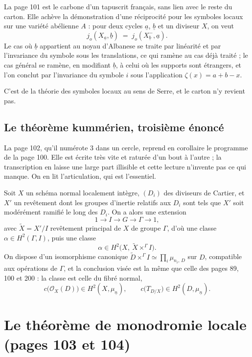 \documentclass[11pt,a4paper]{article}
\begin{document}
La page 101 est le carbone d'un tapuscrit français, sans lien avec le reste du
carton. Elle achève la démonstration d'une réciprocité pour les symboles locaux
sur une variété abélienne $A$ : pour deux cycles $\underline{a}$,
$\underline{b}$ et un diviseur $X$, on veut
\[
  j_{o}(X_{\underline{a}}, \underline{b}) \;=\;
  j_{o}(X^{-}_{\underline{b}}, \underline{a}) .
\]
Le cas où $\underline{b}$ appartient au noyau d'Albanese se traite par
linéarité et par l'invariance du symbole sous les translations, ce qui ramène
au cas déjà traité ; le cas général se ramène, en modifiant $\underline{b}$, à
celui où les supports sont étrangers, et l'on conclut par l'invariance du
symbole $i$ sous l'application $\zeta(x) = a + b - x$.

C'est de la théorie des symboles locaux au sens de Serre, et le carton n'y
revient pas.

\subsection*{Le théorème kummérien, troisième énoncé}

La page 102, qu'il numérote 3 dans un cercle, reprend en corollaire le
programme de la page 100. Elle est écrite très vite et raturée d'un bout à
l'autre ; la transcription en laisse une large part illisible et cette lecture
n'invente pas ce qui manque. On en lit l'articulation, qui est l'essentiel.

Soit $X$ un schéma normal localement intègre, $(D_{i})$ des diviseurs de
Cartier, et $X'$ un revêtement dont les groupes d'inertie relatifs aux $D_{i}$
sont tels que $X'$ soit modérément ramifié le long des $D_{i}$. On a alors une
extension
\[
  1 \longrightarrow I \longrightarrow G \longrightarrow \Gamma
  \longrightarrow 1 ,
\]
avec $\tilde{X} = X'/I$ revêtement principal de $X$ de groupe $\Gamma$, d'où
une classe $\alpha \in H^{2}(\Gamma, I)$, puis une classe
\[
  \alpha \in H^{2}\bigl(X,\ \tilde{X} \times^{\Gamma} I\bigr) .
\]
On dispose d'un isomorphisme canonique
$\tilde{D} \times^{\Gamma} I \simeq \prod_{i} \mu_{n_{i},\,D}$ sur $D$,
compatible aux opérations de $\Gamma$, et la conclusion visée est la même que
celle des pages 89, 100 et 200 : la classe est celle du fibré normal,
\[
  c\bigl(\mathcal{O}_{X}(D)\bigr) \in H^{2}(X, \mu_{\underline{n}}) ,
  \qquad
  c\bigl(T_{D/X}\bigr) \in H^{2}(D, \mu_{\underline{n}}) .
\]

\section*{Le théorème de monodromie locale (pages 103 et 104)}
\end{document}
